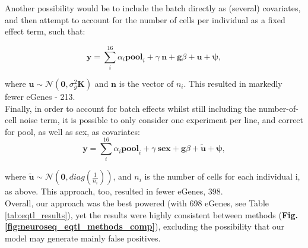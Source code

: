 Another possibility would be to include the batch directly as (several) covariates, and then attempt to account for the number of cells per individual as a fixed effect term, such that:

\begin{equation}\label{eq:neuroseq_batch_kinship}
    \mathbf{y} = \sum_i^{16}\alpha_i \mathbf{pool}_i + \gamma \ \mathbf{n} + \mathbf{g}\beta + \mathbf{u} + \boldsymbol{\psi}, 
\end{equation}

where $ \mathbf{u} \sim \mathcal{N}(\mathbf{0},\sigma_g^2\mathbf{K})$ and $\mathbf{n}$ is the vector of $n_i$. 
This resulted in markedly fewer eGenes - 213.\\

Finally, in order to account for batch effects whilst still including the number-of-cell noise term, it is possible to only consider one experiment per line, and correct for pool, as well as sex, as covariates:
\begin{equation}\label{eq:neuroseq_batch_ncell}
    \mathbf{y} = \sum_i^{16}\alpha_i \mathbf{pool}_i + \gamma \ \mathbf{sex} + \mathbf{g}\beta + \tilde{\mathbf{u}} + \boldsymbol{\psi}, 
\end{equation}

where $\tilde{\mathbf{u}} \sim \mathcal{N}(\mathbf{0}, diag(\frac{1}{n_i}))$, and $n_i$ is the number of cells for each individual i, as above.
This approach, too, resulted in fewer eGenes, 398.\\

Overall, our approach was the best powered (with 698 eGenes, see Table \ref{tab:eqtl_results}), yet the results were highly consistent between methods (\textbf{Fig. \ref{fig:neuroseq_eqtl_methods_comp}}), excluding the possibility that our model may generate mainly false positives.

